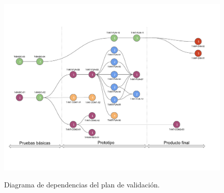 %
%
%

\label{sec:BancoDePruebas}
%


\label{sec:PlanValidacion}


\label{sec:MatrizTrazabilidad}


\begin{figure}[H]
	\centering
	\includegraphics[width=0.9\linewidth]{ImagenesPlan de validacion/Diagrama de Dependencias de Validacion}
	\label{fig:diagrama_plan_validacion}
	\caption{Diagrama de dependencias del plan de validación.}
\end{figure}

%